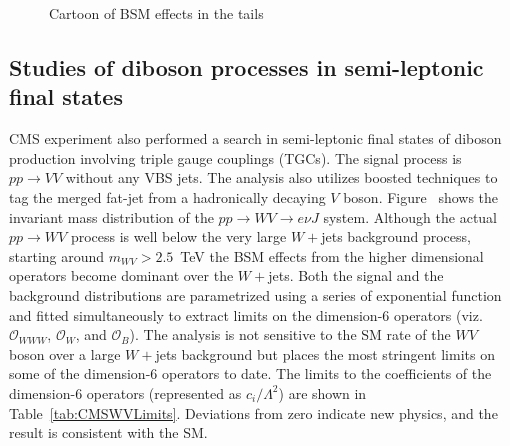 \documentclass[10pt]{article}
\begin{document}
\begin{figure}[htb]
\centering
    \quad\quad
\caption{Cartoon of BSM effects in the tails}
\label{fig:BSMTails}
\end{figure}

\subsection{Studies of diboson processes in semi-leptonic final states}
\label{sec:CMSWV}

CMS experiment also performed a search in semi-leptonic final states of diboson production involving triple gauge couplings (TGCs).
The signal process is $pp\to VV$ without any VBS jets.
The analysis also utilizes boosted techniques to tag the merged fat-jet from a hadronically decaying $V$ boson.
Figure~ shows the invariant mass distribution of the $pp\to WV\to e\nu J$ system.
Although the actual $pp\to WV$ process is well below the very large $W+$jets background process, starting around $m_{WV} > 2.5$~TeV the BSM effects from the higher dimensional operators become dominant over the $W+$jets.
Both the signal and the background distributions are parametrized using a series of exponential function and fitted simultaneously to extract limits on the dimension-6 operators (viz. $\mathcal{O}_{WWW}$, $\mathcal{O}_{W}$, and $\mathcal{O}_{B}$).
The analysis is not sensitive to the SM rate of the $WV$ boson over a large $W+$jets background but places the most stringent limits on some of the dimension-6 operators to date.
The limits to the coefficients of the dimension-6 operators (represented as $c_{i} / \Lambda^2$) are shown in Table~\ref{tab:CMSWVLimits}.
Deviations from zero indicate new physics, and the result is consistent with the SM.
\end{document}
